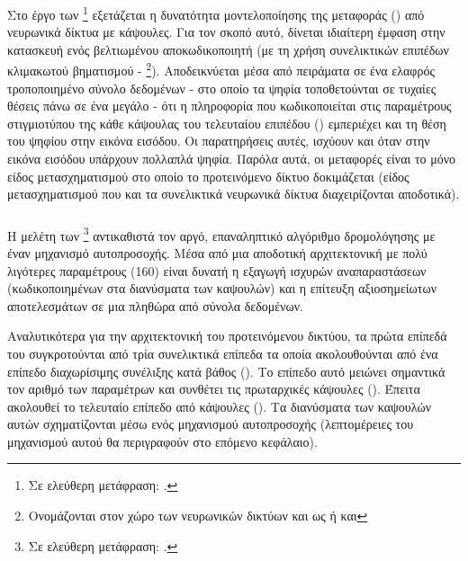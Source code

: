 \subsubsection{}

Στο έργο των  \footnote{Σε ελεύθερη μετάφραση: .} \cite{luo2020capsnet} εξετάζεται η δυνατότητα μοντελοποίησης της μεταφοράς () από νευρωνικά δίκτυα με κάψουλες. Για τον σκοπό αυτό, δίνεται ιδιαίτερη έμφαση στην κατασκευή ενός βελτιωμένου αποκωδικοποιητή (με τη χρήση συνελικτικών επιπέδων κλιμακωτού βηματισμού - \footnote{Ονομάζονται στον χώρο των νευρωνικών δικτύων και ως  ή και }). Αποδεικνύεται μέσα από πειράματα σε ένα ελαφρός τροποποιημένο σύνολο δεδομένων  - στο οποίο τα ψηφία τοποθετούνται σε τυχαίες θέσεις πάνω σε ένα μεγάλο  - ότι η πληροφορία που κωδικοποιείται στις παραμέτρους στιγμιοτύπου της κάθε κάψουλας του τελευταίου επιπέδου () εμπεριέχει και τη θέση του ψηφίου στην εικόνα εισόδου. Οι παρατηρήσεις αυτές, ισχύουν και όταν στην εικόνα εισόδου υπάρχουν πολλαπλά ψηφία. Παρόλα αυτά, οι μεταφορές είναι το μόνο είδος μετασχηματισμού στο οποίο το προτεινόμενο δίκτυο δοκιμάζεται (είδος μετασχηματισμού που και τα συνελικτικά νευρωνικά δίκτυα διαχειρίζονται αποδοτικά).

\subsubsection{}

Η μελέτη των  \footnote{Σε ελεύθερη μετάφραση: .} \cite{mazzia2021efficient} αντικαθιστά τον αργό, επαναληπτικό αλγόριθμο δρομολόγησης με έναν μηχανισμό αυτο\textendash προσοχής. Μέσα από μια αποδοτική αρχιτεκτονική με πολύ λιγότερες παραμέτρους (160) είναι δυνατή η εξαγωγή ισχυρών αναπαραστάσεων (κωδικοποιημένων στα διανύσματα των καψουλών) και η επίτευξη αξιοσημείωτων αποτελεσμάτων σε μια πληθώρα από σύνολα δεδομένων.\par

 Αναλυτικότερα για την αρχιτεκτονική του προτεινόμενου δικτύου, τα πρώτα επίπεδά του συγκροτούνται από τρία συνελικτικά επίπεδα τα οποία ακολουθούνται από ένα επίπεδο διαχωρίσιμης συνέλιξης κατά βάθος (). Το επίπεδο αυτό μειώνει σημαντικά τον αριθμό των παραμέτρων και συνθέτει τις πρωταρχικές κάψουλες (). Έπειτα ακολουθεί το τελευταίο επίπεδο από κάψουλες  (). Τα διανύσματα των καψουλών αυτών σχηματίζονται μέσω ενός μηχανισμού αυτο\textendash προσοχής (λεπτομέρειες του μηχανισμού αυτού θα περιγραφούν στο επόμενο κεφάλαιο).\par

